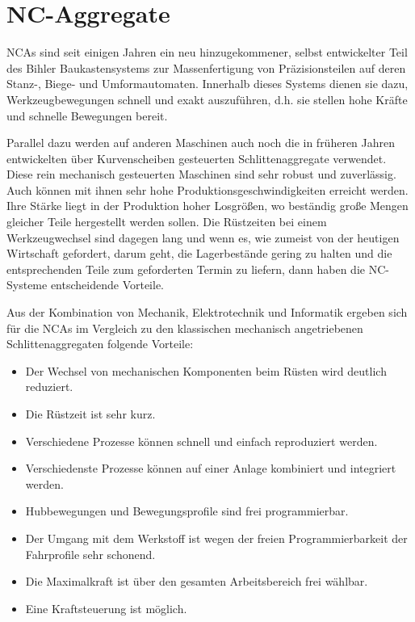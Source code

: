 \chapter{NC-Aggregate}



NCAs sind seit einigen Jahren ein neu hinzugekommener, selbst entwickelter Teil des Bihler Baukastensystems zur Massenfertigung von Präzisionsteilen auf deren Stanz-, Biege- und Umformautomaten. \cite{OttoBihlerMaschinenfabrikGmbH&Co.KG2012} Innerhalb dieses Systems dienen sie dazu, Werkzeugbewegungen schnell und exakt auszuführen, d.h. sie stellen hohe Kräfte und schnelle Bewegungen bereit.



Parallel dazu werden auf anderen Maschinen auch noch die in früheren Jahren entwickelten über Kurvenscheiben gesteuerten Schlittenaggregate verwendet. Diese rein mechanisch gesteuerten Maschinen sind sehr robust und zuverlässig. Auch können mit ihnen sehr hohe Produktionsgeschwindigkeiten erreicht werden. Ihre Stärke liegt in der Produktion hoher Losgrößen, wo beständig große Mengen gleicher Teile hergestellt werden sollen. Die Rüstzeiten bei einem Werkzeugwechsel sind dagegen lang und wenn es, wie zumeist von der heutigen Wirtschaft gefordert, darum geht, die Lagerbestände gering zu halten und die entsprechenden Teile zum geforderten Termin zu liefern, dann haben die NC-Systeme entscheidende Vorteile.


Aus der Kombination von Mechanik, Elektrotechnik und Informatik ergeben sich für die NCAs im Vergleich zu den klassischen mechanisch angetriebenen Schlittenaggregaten folgende Vorteile: \cite{OttoBihlerMaschinenfabrikGmbH&Co.KG2012} 

\begin{itemize}
 \item Der Wechsel von mechanischen Komponenten beim Rüsten wird deutlich reduziert.
 \item Die Rüstzeit ist sehr kurz.
  \item Verschiedene Prozesse können schnell und einfach reproduziert werden. 
 \item Verschiedenste Prozesse können auf einer Anlage kombiniert und integriert werden.
 \item Hubbewegungen und Bewegungsprofile sind frei programmierbar.
 \item Der Umgang mit dem Werkstoff ist wegen der freien Programmierbarkeit der Fahrprofile sehr schonend.
 \item Die Maximalkraft ist über den gesamten Arbeitsbereich frei wählbar.
 \item Eine Kraftsteuerung ist möglich.
\end{itemize}






